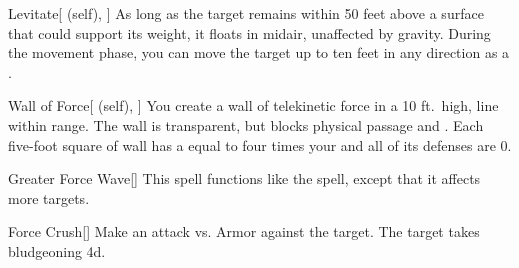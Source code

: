\lowercase{\hypertarget{spell:Levitate}{}}\label{spell:Levitate}
\begin{attuneability}[\nth{4}]{\hypertarget{spell:Levitate}{Levitate}}[ (self), ]
As long as the target remains within 50 feet above a surface that could support its weight, it floats in midair, unaffected by gravity.
During the movement phase, you can move the target up to ten feet in any direction as a .
\end{attuneability}
\vspace{0.25em}



\lowercase{\hypertarget{spell:Wall of Force}{}}\label{spell:Wall of Force}
\begin{attuneability}[\nth{4}]{\hypertarget{spell:Wall of Force}{Wall of Force}}[ (self), ]
\targetrule
You create a wall of telekinetic force in a 10 ft.\ high, \arealarge line within \rngmed range.
The wall is transparent, but blocks physical passage and .
Each five-foot square of wall has a  equal to four times your  and all of its defenses are 0.
\end{attuneability}
\vspace{0.25em}



\lowercase{\hypertarget{spell:Greater Force Wave}{}}\label{spell:Greater Force Wave}
\begin{freeability}[\nth{5}]{\hypertarget{spell:Greater Force Wave}{Greater Force Wave}}[]
This spell functions like the  spell, except that it affects more targets.
\end{freeability}
\vspace{0.25em}



\lowercase{\hypertarget{spell:Force Crush}{}}\label{spell:Force Crush}
\begin{freeability}[\nth{6}]{\hypertarget{spell:Force Crush}{Force Crush}}[]
Make an attack vs. Armor against the target.
\hit The target takes bludgeoning  \plus4d.
\end{freeability}
\vspace{0.25em}



